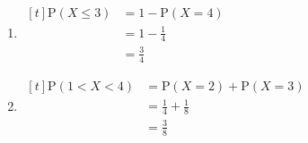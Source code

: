 \documentclass[11pt,a4paper]{book}
\begin{document}
\begin{example}
\begin{enumerate}[label=(\alph*)]
\begin{tabular}[t]{|>{\centering}m{2cm}|>{\centering}m{2cm}|>{\centering}m{2cm}|>{\centering}m{2cm}|>{\centering}m{2cm}|}
\smallskip\tabularnewline
\hline
\end{tabular}

\item
$
\begin{aligned}[t]
\text{P}\left(X\leq3\right) & =1-\text{P}\left(X=4\right)\\
 & =1-\frac{1}{4}\\
 & =\frac{3}{4}
\end{aligned}
$

\item
$
\begin{aligned}[t]
\text{P}\left(1<X<4\right) & =\text{P}\left(X=2\right)+\text{P}\left(X=3\right)\\
 & =\frac{1}{4}+\frac{1}{8}\\
 & =\frac{3}{8}
\end{aligned}
$

\end{enumerate}

\end{example}

\newpage
\end{document}
